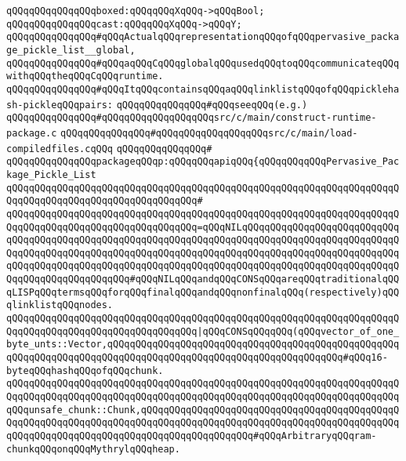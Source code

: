 \newline
\verb|qQQqqQQqqQQqqQQqboxed:qQQqqQQqXqQQq->qQQqBool;|\newline
\newline
\verb|qQQqqQQqqQQqqQQqcast:qQQqqQQqXqQQq->qQQqY;|\newline
\newline
\verb|qQQqqQQqqQQqqQQq#qQQqActualqQQqrepresentationqQQqofqQQqpervasive_package_pickle_list__global,|\newline
\verb|qQQqqQQqqQQqqQQq#qQQqaqQQqCqQQqglobalqQQqusedqQQqtoqQQqcommunicateqQQqwithqQQqtheqQQqCqQQqruntime.|\newline
\verb|qQQqqQQqqQQqqQQq#qQQqItqQQqcontainsqQQqaqQQqlinklistqQQqofqQQqpicklehash-pickleqQQqpairs:|\newline
\verb|qQQqqQQqqQQqqQQq#qQQqseeqQQq(e.g.)|\newline
\verb|qQQqqQQqqQQqqQQq#qQQqqQQqqQQqqQQqqQQqsrc/c/main/construct-runtime-package.c|\newline
\verb|qQQqqQQqqQQqqQQq#qQQqqQQqqQQqqQQqqQQqsrc/c/main/load-compiledfiles.cqQQq|\newline
\verb|qQQqqQQqqQQqqQQq#|\newline
\verb|qQQqqQQqqQQqqQQqpackageqQQqp:qQQqqQQqapiqQQq{qQQqqQQqqQQqPervasive_Package_Pickle_List|\newline
\verb|qQQqqQQqqQQqqQQqqQQqqQQqqQQqqQQqqQQqqQQqqQQqqQQqqQQqqQQqqQQqqQQqqQQqqQQqqQQqqQQqqQQqqQQqqQQqqQQqqQQqqQQq#|\newline
\verb|qQQqqQQqqQQqqQQqqQQqqQQqqQQqqQQqqQQqqQQqqQQqqQQqqQQqqQQqqQQqqQQqqQQqqQQqqQQqqQQqqQQqqQQqqQQqqQQqqQQqqQQq=qQQqNILqQQqqQQqqQQqqQQqqQQqqQQqqQQqqQQqqQQqqQQqqQQqqQQqqQQqqQQqqQQqqQQqqQQqqQQqqQQqqQQqqQQqqQQqqQQqqQQqqQQqqQQqqQQqqQQqqQQqqQQqqQQqqQQqqQQqqQQqqQQqqQQqqQQqqQQqqQQqqQQqqQQqqQQqqQQqqQQqqQQqqQQqqQQqqQQqqQQqqQQqqQQqqQQqqQQqqQQqqQQqqQQqqQQqqQQqqQQqqQQqqQQqqQQqqQQqqQQqqQQq#qQQqNILqQQqandqQQqCONSqQQqareqQQqtraditionalqQQqLISPqQQqtermsqQQqforqQQqfinalqQQqandqQQqnonfinalqQQq(respectively)qQQqlinklistqQQqnodes.|\newline
\verb|qQQqqQQqqQQqqQQqqQQqqQQqqQQqqQQqqQQqqQQqqQQqqQQqqQQqqQQqqQQqqQQqqQQqqQQqqQQqqQQqqQQqqQQqqQQqqQQqqQQqqQQq|\verb#|qQQqCONSqQQqqQQq(qQQqvector_of_one_byte_unts::Vector,qQQqqQQqqQQqqQQqqQQqqQQqqQQqqQQqqQQqqQQqqQQqqQQqqQQqqQQqqQQqqQQqqQQqqQQqqQQqqQQqqQQqqQQqqQQqqQQqqQQqqQQqqQQqqQQq#\verb|#qQQq16-byteqQQqhashqQQqofqQQqchunk.|\newline
\verb|qQQqqQQqqQQqqQQqqQQqqQQqqQQqqQQqqQQqqQQqqQQqqQQqqQQqqQQqqQQqqQQqqQQqqQQqqQQqqQQqqQQqqQQqqQQqqQQqqQQqqQQqqQQqqQQqqQQqqQQqqQQqqQQqqQQqqQQqqQQqqQQqunsafe_chunk::Chunk,qQQqqQQqqQQqqQQqqQQqqQQqqQQqqQQqqQQqqQQqqQQqqQQqqQQqqQQqqQQqqQQqqQQqqQQqqQQqqQQqqQQqqQQqqQQqqQQqqQQqqQQqqQQqqQQqqQQqqQQqqQQqqQQqqQQqqQQqqQQqqQQqqQQqqQQqqQQqqQQq#qQQqArbitraryqQQqram-chunkqQQqonqQQqMythrylqQQqheap.|\newline

